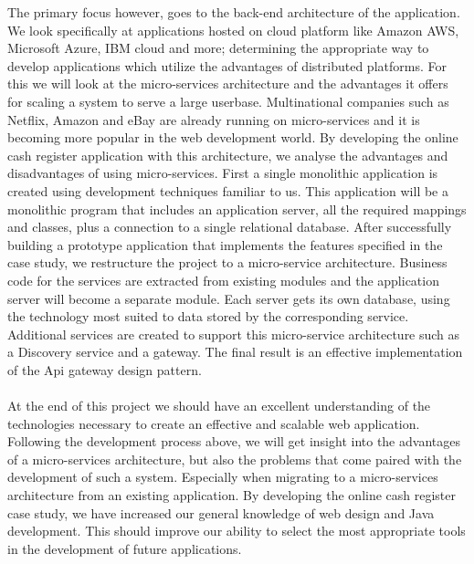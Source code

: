 \documentclass[12pt]{article}
\begin{document}
The primary focus however, goes to the back-end architecture of the application. We look speciﬁcally at applications hosted on cloud platform like Amazon AWS, Microsoft Azure, IBM cloud and more; determining the appropriate way to develop applications which utilize the advantages of distributed platforms. For this we will look at the micro-services architecture and the advantages it offers for scaling a system to serve a large userbase. Multinational companies such as Netﬂix, Amazon and eBay are already running on micro-services and it is becoming more popular in the web development world. By developing the online cash register application with this architecture, we analyse the advantages and disadvantages of using micro-services. First a single monolithic application is created using development techniques familiar to us. This application will be a monolithic program that includes an application server, all the required mappings and classes, plus a connection to a single relational database. After successfully building a prototype application that implements the features specified in the case study, we restructure the project to a micro-service architecture. Business code for the services are extracted from existing modules and the application server will become a separate module. Each server gets its own database, using the technology most suited to data stored by the corresponding service. Additional services are created to support this micro-service architecture such as a Discovery service and a gateway. The final result is an effective implementation of the Api gateway design pattern. 
\\\\
At the end of this project we should have an excellent understanding of the technologies necessary to create an effective and scalable web application. Following the development process above, we will get insight into the advantages of a micro-services architecture, but also the problems that come paired with the development of such a system. Especially when migrating to a micro-services architecture from an existing application. By developing the online cash register case study, we have increased our general knowledge of web design and Java development. This should improve our ability to select the most appropriate tools in the development of future applications.



\end{document}
